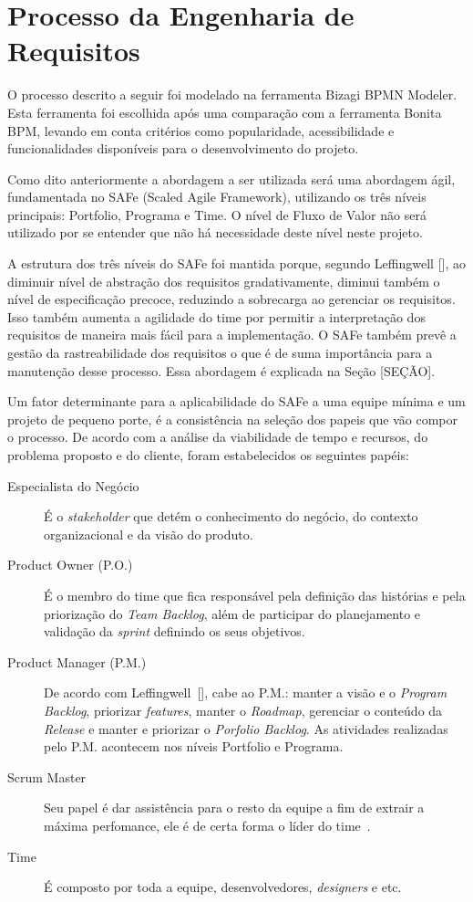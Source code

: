 \chapter[Processo da Engenharia de Requisitos]{Processo da Engenharia de Requisitos}
O processo descrito a seguir foi modelado na ferramenta Bizagi BPMN Modeler. Esta ferramenta foi escolhida após uma comparação com a ferramenta Bonita BPM, levando em conta critérios como popularidade, acessibilidade e funcionalidades disponíveis para o desenvolvimento do projeto.

Como dito anteriormente a abordagem a ser utilizada será uma abordagem ágil, fundamentada no SAFe (Scaled Agile Framework), utilizando os três níveis principais: Portfolio, Programa e Time. O nível de Fluxo de Valor não será utilizado por se entender que não há necessidade deste nível neste projeto.

A estrutura dos três níveis do SAFe foi mantida porque, segundo Leffingwell [\citeyear{leffingwell}], ao diminuir nível de abstração dos requisitos gradativamente, diminui também o nível de especificação precoce, reduzindo a sobrecarga ao gerenciar os requisitos. Isso também aumenta a agilidade do time por permitir a interpretação dos requisitos de maneira mais fácil para a implementação. O SAFe também prevê a gestão da rastreabilidade dos requisitos o que é de suma importância para a manutenção desse processo. Essa abordagem é explicada na Seção [SEÇÃO].

Um fator determinante para a aplicabilidade do SAFe a uma equipe mínima e um projeto de pequeno porte, é a consistência na seleção dos papeis que vão compor o processo. De acordo com a análise da viabilidade de tempo e recursos, do problema proposto e do cliente, foram estabelecidos os seguintes papéis:

\begin{description}
\item[Especialista do Negócio] É o \textit{stakeholder} que detém o conhecimento do negócio, do contexto organizacional e da visão do produto.    
\item[Product Owner (P.O.)] É o membro do time que fica responsável pela definição das histórias e pela priorização do \textit{Team Backlog}, além de participar do planejamento e validação da \textit{sprint} definindo os seus objetivos.
\item[Product Manager (P.M.)] De acordo com Leffingwell~[\citeyear{leffingwell}], cabe ao P.M.: manter a visão e o \textit{Program Backlog}, priorizar \textit{features}, manter o \textit{Roadmap}, gerenciar o conteúdo da \textit{Release} e manter e priorizar o \textit{Porfolio Backlog}. As atividades realizadas pelo P.M. acontecem nos níveis Portfolio e Programa.
\item[Scrum Master] Seu papel é dar assistência para o resto da equipe a fim de extrair a máxima perfomance, ele é de certa forma o líder do time~\cite{leffingwell}.
\item[Time] É composto por toda a equipe, desenvolvedores, \textit{designers} e etc.
\end{description}

